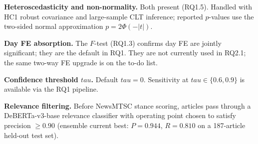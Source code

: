 \documentclass[11pt]{article}
\def\tau{tau}%
\begin{document}
\textbf{Heteroscedasticity and non-normality.} Both present (RQ1.5). Handled with HC1 robust covariance and large-sample CLT inference; reported $p$-values use the two-sided normal approximation $p = 2\Phi(-|t|)$.

\textbf{Day FE absorption.} The $F$-test (RQ1.3) confirms day FE are jointly significant; they are the default in RQ1. They are not currently used in RQ2.1; the same two-way FE upgrade is on the to-do list.

\textbf{Confidence threshold $\tau$.} Default $\tau = 0$. Sensitivity at $\tau \in \{0.6, 0.9\}$ is available via the RQ1 pipeline.

\textbf{Relevance filtering.} Before NewsMTSC stance scoring, articles pass through a DeBERTa-v3-base relevance classifier with operating point chosen to satisfy precision $\ge 0.90$ (ensemble current best: $P = 0.944$, $R = 0.810$ on a 187-article held-out test set).

\end{document}
